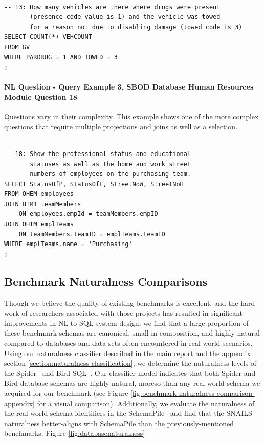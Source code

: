 \begin{verbatim}

-- 13: How many vehicles are there where drugs were present 
       (presence code value is 1) and the vehicle was towed 
       for a reason not due to disabling damage (towed code is 3)
SELECT COUNT(*) VEHCOUNT
FROM GV
WHERE PARDRUG = 1 AND TOWED = 3
;
\end{verbatim}


\paragraph{NL Question - Query Example 3, SBOD Database Human Resources Module Question 18}
Questions vary in their complexity.
This example shows one of the more complex questions that require multiple projections and joins as well as a selection.

\begin{verbatim}
  
-- 18: Show the professional status and educational 
       statuses as well as the home and work street 
       numbers of employees on the purchasing team.
SELECT StatusOfP, StatusOfE, StreetNoW, StreetNoH
FROM OHEM employees
JOIN HTM1 teamMembers 
    ON employees.empId = teamMembers.empID
JOIN OHTM emplTeams 
    ON teamMembers.teamID = emplTeams.teamID
WHERE emplTeams.name = 'Purchasing'
;
\end{verbatim}

\subsection{Benchmark Naturalness Comparisons}

Though we believe the quality of existing benchmarks is excellent, and the hard work of researchers associated with those projects has resulted in significant improvements in NL-to-SQL system design, we find that a large proportion of these benchmark schemas are canonical, small in composition, and highly natural compared to databases and data sets often encountered in real world scenarios.
Using our naturalness classifier described in the main report and the appendix section \ref{section:naturalness-classification}, we determine the naturalness levels of the Spider~\cite{Yu&al.18c} and Bird-SQL~\cite{li2023llm}.
Our classifier model indicates that both Spider and Bird database schemas are highly natural, moreso than any real-world schema we acquired for our benchmark (see Figure \ref{fig:benchmark-naturalness-comparison-appendix} for a visual comparison).
Additionally, we evaluate the naturalness of the real-world schema identifiers in the SchemaPile~\cite{doehmen2024schemapile} and find that the SNAILS naturalness better-aligns with SchemaPile than the previously-mentioned benchmarks.
Figure \ref{fig:databasenaturalness}


